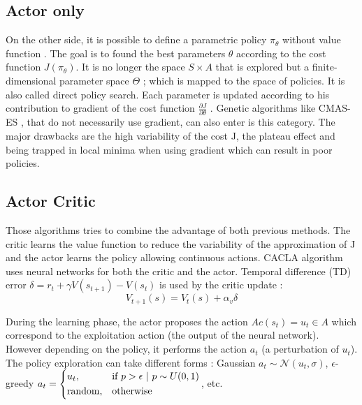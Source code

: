 \subsection{Actor only}

On the other side, it is possible to define a parametric policy $\pi_{\theta}$ without value function \cite{Sutton1999}.
The goal is to found the best parameters $\theta$ according to the cost function $J(\pi_{\theta})$. 
It is no longer the space $S \times A$ that is explored but a finite-dimensional parameter space $\Theta$ ;
which is mapped to the space of policies. It is also called direct policy search.
Each parameter is updated according to his contribution to gradient of the cost function 
$ \frac{\partial J}{\partial \theta} $ \cite{Kober2010a}.
Genetic algorithms like CMAS-ES \cite{Hansen2001}, that do not necessarily use gradient, can also enter is this category.
The major drawbacks are the high variability of the cost J, the plateau effect and being trapped in local minima when using gradient which can result in poor policies.

\subsection{Actor Critic}

Those algorithms \cite{Konda2003} tries to combine the advantage of both previous methods.
The critic learns the value function to reduce the variability of the approximation of J 
and the actor learns the policy allowing continuous actions.
CACLA algorithm \cite{VanHasselt2007a} uses neural networks for both the critic and the actor.
Temporal difference (TD) error $\delta = r_t + \gamma V(s_{t+1}) - V(s_t)$ is used by the critic update :
\begin{equation}
 V_{t+1}(s) = V_t(s) + \alpha_v \delta
\end{equation}

During the learning phase, the actor proposes the action $Ac(s_t) = u_t \in A$  which correspond to the exploitation action (the output of the neural network).
However depending on the policy, it performs the action $a_t$ (a perturbation of $u_t$). The policy exploration can take different forms : Gaussian $a_t \sim \mathcal{N}(u_t, \sigma)$, 
$\epsilon$-greedy 
$a_t = 
\begin{dcases} u_t, & \text{if }p > \epsilon\ |\ p \sim U(0,1) \\
      \text{random}, & \text{otherwise}
\end{dcases}$, etc.

